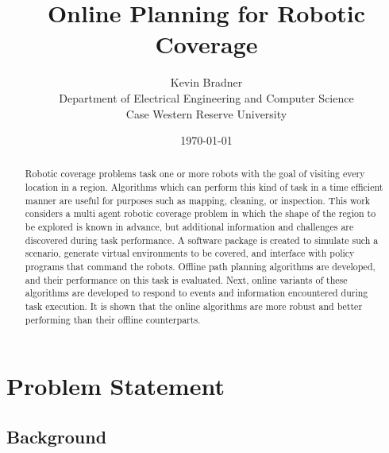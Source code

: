 \documentclass[letterpaper, 12pt, leqno]{report}
\begin{document}
\title{Online Planning for Robotic Coverage}
\author{Kevin Bradner\\Department of Electrical Engineering and Computer Science\\Case Western Reserve University}
\date{\monthyeardate\today}
\maketitle

\begin{abstract}
Robotic coverage problems task one or more robots with the goal of visiting every location in a region. Algorithms which can perform this kind of task in a time efficient manner are useful for purposes such as mapping, cleaning, or inspection. This work considers a multi agent robotic coverage problem in which the shape of the region to be explored is known in advance, but additional information and challenges are discovered during task performance. A software package is created to simulate such a scenario, generate virtual environments to be covered, and interface with policy programs that command the robots. Offline path planning algorithms are developed, and their performance on this task is evaluated. Next, online variants of these algorithms are developed to respond to events and information encountered during task execution. It is shown that the online algorithms are more robust and better performing than their offline counterparts.
\end{abstract}

\chapter{Problem Statement}

\section{Background}
\end{document}
